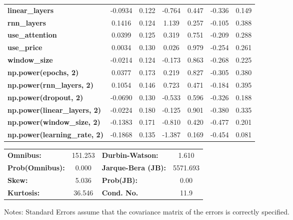 \begin{center}
\begin{tabular}{lcccccc}
\textbf{linear\_layers}              &      -0.0934  &        0.122     &    -0.764  &         0.447        &       -0.336    &        0.149     \\
\textbf{rnn\_layers}                 &       0.1416  &        0.124     &     1.139  &         0.257        &       -0.105    &        0.388     \\
\textbf{use\_attention}              &       0.0399  &        0.125     &     0.319  &         0.751        &       -0.209    &        0.288     \\
\textbf{use\_price}                  &       0.0034  &        0.130     &     0.026  &         0.979        &       -0.254    &        0.261     \\
\textbf{window\_size}                &      -0.0214  &        0.124     &    -0.173  &         0.863        &       -0.268    &        0.225     \\
\textbf{np.power(epochs, 2)}         &       0.0377  &        0.173     &     0.219  &         0.827        &       -0.305    &        0.380     \\
\textbf{np.power(rnn\_layers, 2)}    &       0.1054  &        0.146     &     0.723  &         0.471        &       -0.184    &        0.395     \\
\textbf{np.power(dropout, 2)}        &      -0.0690  &        0.130     &    -0.533  &         0.596        &       -0.326    &        0.188     \\
\textbf{np.power(linear\_layers, 2)} &      -0.0224  &        0.180     &    -0.125  &         0.901        &       -0.380    &        0.335     \\
\textbf{np.power(window\_size, 2)}   &      -0.1383  &        0.171     &    -0.810  &         0.420        &       -0.477    &        0.201     \\
\textbf{np.power(learning\_rate, 2)} &      -0.1868  &        0.135     &    -1.387  &         0.169        &       -0.454    &        0.081     \\
\bottomrule
\end{tabular}
\begin{tabular}{lclc}
\textbf{Omnibus:}       & 151.253 & \textbf{  Durbin-Watson:     } &    1.610  \\
\textbf{Prob(Omnibus):} &   0.000 & \textbf{  Jarque-Bera (JB):  } & 5571.693  \\
\textbf{Skew:}          &   5.036 & \textbf{  Prob(JB):          } &     0.00  \\
\textbf{Kurtosis:}      &  36.546 & \textbf{  Cond. No.          } &     11.9  \\
\bottomrule
\end{tabular}
\end{center}

Notes: \newline
 [1] Standard Errors assume that the covariance matrix of the errors is correctly specified.
